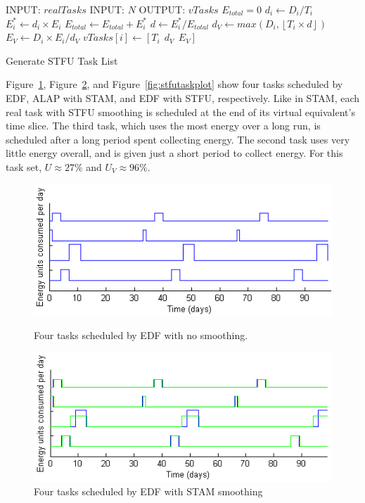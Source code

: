 \begin{algorithm}[htb]
\label{alg:stfualg}
\begin{algorithmic}
\STATE INPUT: $realTasks$  
\STATE INPUT: $N$ 
\STATE OUTPUT: $vTasks$ 
\STATE $E_{total} = 0$
\STATE $d_i \gets D_i / T_i$
\STATE $E_i^* \gets d_i \times E_i$
\STATE $E_{total} \gets E_{total} + E_i^*$
\ENDFOR
{}
\STATE $d \gets E_i^* / E_{total}$
\STATE $d_{V} \gets max(D_i, \left \lfloor T_i \times d \right \rfloor)$
\STATE $E_V \gets D_i \times E_i / d_{V}$
\STATE $vTasks[i] \gets [T_i~~d_{V}~~E_V]$
\ENDFOR
\end{algorithmic}
\caption{Generate \textsc{STFU} Task List}
\end{algorithm}

Figure~\ref{fig:edftasksched}, Figure~\ref{fig:stamtaskplot}, and Figure~\ref{fig:stfutaskplot} show four tasks scheduled by EDF, ALAP with \textsc{STAM}, and EDF with \textsc{STFU}, respectively.  Like in \textsc{STAM}, each real task with \textsc{STFU} smoothing is scheduled at the end of its virtual equivalent's time slice.  The third task, which uses the most energy over a long run, is scheduled after a long period spent collecting energy.  The second task uses very little energy overall, and is given just a short period to collect energy.  For this task set, $U \approx 27\%$ and $U_V \approx 96\%$.


\begin{figure}[htb]
\includegraphics[scale=0.72]{edftasks.png}
\label{fig:edftasksched}
\caption{Four tasks scheduled by EDF with no smoothing.}
\end{figure}

\begin{figure}[htb]
\includegraphics[scale=0.72]{stamtasks.png}
\caption{Four tasks scheduled by EDF with \textsc{STAM} smoothing}
\label{fig:stamtaskplot}
\end{figure}


